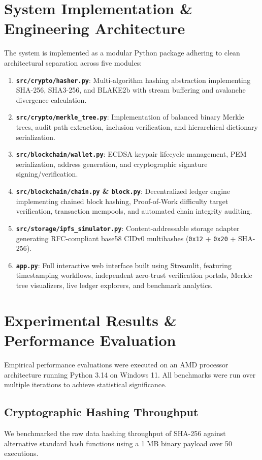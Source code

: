 \documentclass[conference]{IEEEtran}
\begin{document}
\section{System Implementation \& Engineering Architecture}
The system is implemented as a modular Python package adhering to clean architectural separation across five modules:
\begin{enumerate}
    \item \textbf{\texttt{src/crypto/hasher.py}}: Multi-algorithm hashing abstraction implementing SHA-256, SHA3-256, and BLAKE2b with stream buffering and avalanche divergence calculation.
    \item \textbf{\texttt{src/crypto/merkle\_tree.py}}: Implementation of balanced binary Merkle trees, audit path extraction, inclusion verification, and hierarchical dictionary serialization.
    \item \textbf{\texttt{src/blockchain/wallet.py}}: ECDSA keypair lifecycle management, PEM serialization, address generation, and cryptographic signature signing/verification.
    \item \textbf{\texttt{src/blockchain/chain.py} \& \texttt{block.py}}: Decentralized ledger engine implementing chained block hashing, Proof-of-Work difficulty target verification, transaction mempools, and automated chain integrity auditing.
    \item \textbf{\texttt{src/storage/ipfs\_simulator.py}}: Content-addressable storage adapter generating RFC-compliant base58 CIDv0 multihashes (\texttt{0x12} + \texttt{0x20} + SHA-256).
    \item \textbf{\texttt{app.py}}: Full interactive web interface built using Streamlit, featuring timestamping workflows, independent zero-trust verification portals, Merkle tree visualizers, live ledger explorers, and benchmark analytics.
\end{enumerate}

\section{Experimental Results \& Performance Evaluation}
Empirical performance evaluations were executed on an AMD processor architecture running Python 3.14 on Windows 11. All benchmarks were run over multiple iterations to achieve statistical significance.

\subsection{Cryptographic Hashing Throughput}
We benchmarked the raw data hashing throughput of SHA-256 against alternative standard hash functions using a 1 MB binary payload over 50 executions.
\end{document}
